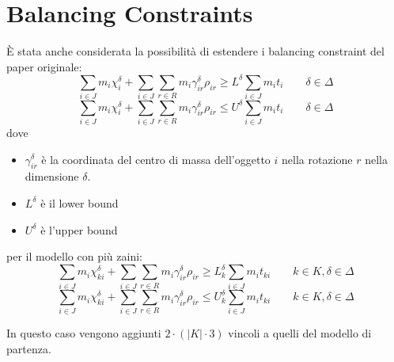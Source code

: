 \section{Balancing Constraints}
\label{sec:Balancing:Constraint}
È stata anche considerata la possibilità di estendere i balancing constraint 
del paper originale:
\setcounter{tmp}{\value{equation}}
\setcounter{equation}{13}
\begin{equation}
\label{eq:orig:balancing1}
\sum_{i \in J} m_i \chi_{i}^\delta + \sum_{i \in J}\sum_{r \in R} m_i \gamma_{ir}^\delta \rho_{ir} \geq L^\delta \sum_{i \in J} m_i t_i \quad\quad \delta \in \Delta
\end{equation}
\begin{equation}
\label{eq:orig:balancing2}
\sum_{i \in J} m_i \chi_{i}^\delta + \sum_{i \in J}\sum_{r \in R} m_i \gamma_{ir}^\delta \rho_{ir} \leq U^\delta \sum_{i \in J} m_i t_i \quad\quad \delta \in \Delta
\end{equation}
\setcounter{equation}{\value{tmp}}
dove 
\begin{itemize}
	\item $\gamma_{ir}^\delta$ è la coordinata del centro di massa dell'oggetto 
	$i$ nella rotazione $r$ nella dimensione $\delta$.
	\item $L^\delta$ è il lower bound 
	\item $U^\delta$ è l'upper bound
\end{itemize}

per il modello con più zaini:
\begin{equation}
\sum_{i \in J} m_i \chi_{ki}^\delta + \sum_{i \in J}\sum_{r \in R} m_i \gamma_{ir}^\delta \rho_{ir} \geq L_k^\delta \sum_{i \in J} m_i t_{ki} \quad\quad k \in K, \delta \in \Delta
\end{equation}
\begin{equation}
\sum_{i \in J} m_i \chi_{ki}^\delta + \sum_{i \in J}\sum_{r \in R} m_i \gamma_{ir}^\delta \rho_{ir} \leq U_k^\delta \sum_{i \in J} m_i t_{ki} \quad\quad k \in K, \delta \in \Delta
\end{equation}

In questo caso vengono aggiunti $2 \cdot (|K| \cdot 3)$ vincoli a quelli del 
modello di partenza.
